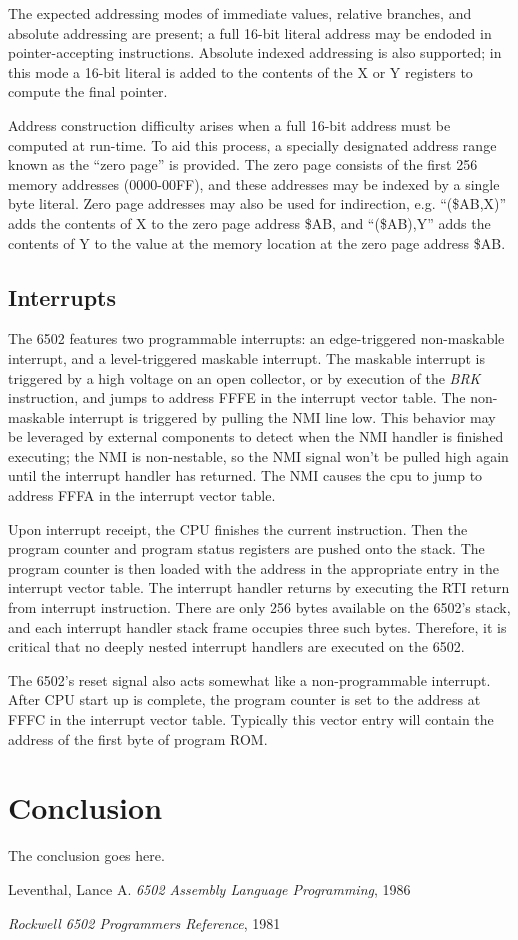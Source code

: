 \documentclass[journal]{IEEEtran}
\begin{document}
The expected addressing modes of immediate values, relative branches, and
absolute addressing are present; a full 16-bit literal address may be endoded
in pointer-accepting instructions. Absolute indexed addressing is also
supported; in this mode a 16-bit literal is added to the contents of the X or Y
registers to compute the final pointer.

Address construction difficulty arises when a full 16-bit address must be
computed at run-time. To aid this process, a specially designated address range
known as the ``zero page'' is provided. The zero page consists of the first 256
memory addresses (0000-00FF), and these addresses may be indexed by a single
byte literal. Zero page addresses may also be used for indirection, e.g.
``(\$AB,X)'' adds the contents of X to the zero page address \$AB, and
``(\$AB),Y'' adds the contents of Y to the value at the memory location at the
zero page address \$AB.

\subsection{Interrupts}

The 6502 features two programmable interrupts: an edge-triggered non-maskable
interrupt, and a level-triggered maskable interrupt. The maskable interrupt
is triggered by a high voltage on an open collector, or by execution of the
\emph{BRK} instruction, and jumps to address FFFE in the interrupt vector table.
The non-maskable interrupt is triggered by pulling the NMI line low. This
behavior may be leveraged by external components to detect when the NMI handler
is finished executing; the NMI is non-nestable, so the NMI signal won't be
pulled high again until the interrupt handler has returned. The NMI causes the
cpu to jump to address FFFA in the interrupt vector table.

Upon interrupt receipt, the CPU finishes the current instruction. Then the
program counter and program status registers are pushed onto the stack. The
program counter is then loaded with the address in the appropriate entry in the
interrupt vector table. The interrupt handler returns by executing the
RTI return from interrupt instruction. There are only 256 bytes
available on the 6502's stack, and each interrupt handler stack frame occupies
three such bytes. Therefore, it is critical that no deeply nested interrupt
handlers are executed on the 6502.

The 6502's reset signal also acts somewhat like a non-programmable interrupt.
After CPU start up is complete, the program counter is set to the address at
FFFC in the interrupt vector table. Typically this vector entry will contain
the address of the first byte of program ROM.

\section{Conclusion}
The conclusion goes here.

\begin{thebibliography}{1}

Leventhal, Lance A. \emph{6502 Assembly Language Programming}, 1986

\emph{Rockwell 6502 Programmers Reference}, 1981

\end{thebibliography}
\end{document}
